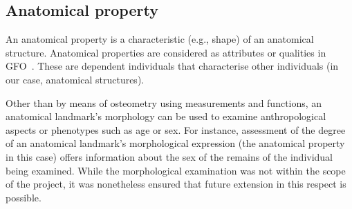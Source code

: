 \documentclass[sw]{iosart2x}
\begin{document}
\subsection{Anatomical property}
An anatomical property is a characteristic (e.g., shape) of an anatomical structure.
Anatomical properties are considered as attributes or qualities in GFO~\citep{gfoarchitecture}.
These are dependent individuals that characterise other individuals (in our case, anatomical structures).

Other than by means of osteometry using measurements and functions, an anatomical landmark’s morphology can be used to examine anthropological aspects or phenotypes such as age or sex.
For instance, assessment of the degree of an anatomical landmark’s morphological expression (the anatomical property in this case) offers information about the sex of the remains of the individual being examined.
While the morphological examination was not within the scope of the project, it was nonetheless ensured that future extension in this respect is possible.
\end{document}
